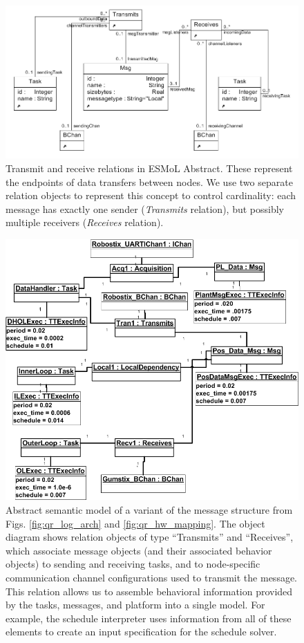\begin{figure}
\centering
\includegraphics[width=0.7\columnwidth]{figures/tran_rcv.png}
    \caption{Transmit and receive relations in ESMoL Abstract. These
represent the endpoints of data transfers between nodes. We use two separate 
relation objects to represent this concept to control cardinality: each message 
has exactly one sender (\emph{Transmits} relation), but possibly multiple 
receivers (\emph{Receives} relation).}
    \label{fig:trnrcv_meta}
\end{figure}

\begin{figure}
\centering
\includegraphics[width=0.5\columnwidth]{figures/msg_struct.png}
    \caption{Abstract semantic model of a variant of the message structure from Figs.
\ref{fig:qr_log_arch} and \ref{fig:qr_hw_mapping}. The object diagram shows relation 
objects of type "`Transmits"' and "`Receives"', which associate message objects (and their associated 
behavior objects) to sending and receiving tasks, and to node-specific communication channel configurations 
used to transmit the message.  This relation allows us to assemble behavioral information provided by the 
tasks, messages, and platform into a single model.  For example, the schedule interpreter uses information 
from all of these elements to create an input specification for the schedule solver. }
    \label{fig:msg_sched}
\end{figure}

